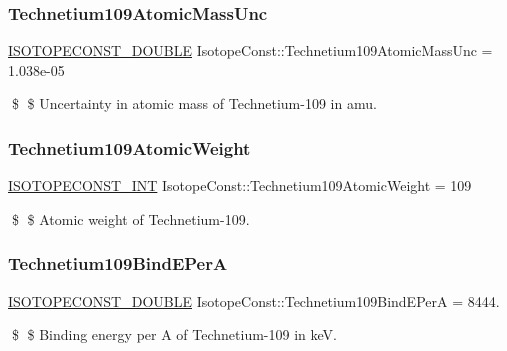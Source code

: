 \subsubsection{\texorpdfstring{Technetium109\+Atomic\+Mass\+Unc}{Technetium109AtomicMassUnc}}
{\footnotesize\ttfamily \mbox{\hyperlink{group___isotope_const-_macros_ga8f45a7272ce02c0b4c65c44636ed719a}{I\+S\+O\+T\+O\+P\+E\+C\+O\+N\+S\+T\+\_\+\+D\+O\+U\+B\+LE}} Isotope\+Const\+::\+Technetium109\+Atomic\+Mass\+Unc = 1.\+038e-\/05}

\$ \$ Uncertainty in atomic mass of Technetium-\/109 in amu. \mbox{\label{group___isotope_const-_technetium-_tc109_ga4507e10dfa99fcd2f1b16f4f2809ace3}} 
\subsubsection{\texorpdfstring{Technetium109\+Atomic\+Weight}{Technetium109AtomicWeight}}
{\footnotesize\ttfamily \mbox{\hyperlink{group___isotope_const-_macros_ga5f18360b3e99483a35c32d789e62621c}{I\+S\+O\+T\+O\+P\+E\+C\+O\+N\+S\+T\+\_\+\+I\+NT}} Isotope\+Const\+::\+Technetium109\+Atomic\+Weight = 109}

\$ \$ Atomic weight of Technetium-\/109. \mbox{\label{group___isotope_const-_technetium-_tc109_ga410ba2ec2b9b524b4611d7081052ffad}} 
\subsubsection{\texorpdfstring{Technetium109\+Bind\+E\+PerA}{Technetium109BindEPerA}}
{\footnotesize\ttfamily \mbox{\hyperlink{group___isotope_const-_macros_ga8f45a7272ce02c0b4c65c44636ed719a}{I\+S\+O\+T\+O\+P\+E\+C\+O\+N\+S\+T\+\_\+\+D\+O\+U\+B\+LE}} Isotope\+Const\+::\+Technetium109\+Bind\+E\+PerA = 8444.}

\$ \$ Binding energy per A of Technetium-\/109 in keV. \mbox{\label{group___isotope_const-_technetium-_tc109_gae9f75121a41754b9ece59ec8d6681a23}} 
